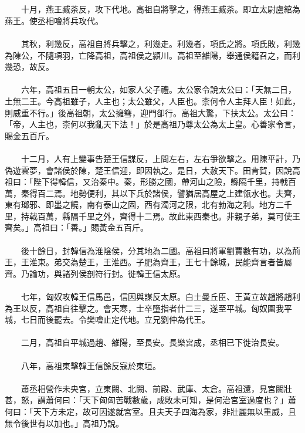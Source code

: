 \\\\
　　十月，燕王臧荼反，攻下代地。高祖自將擊之，得燕王臧荼。即立太尉盧綰為燕王。使丞相噲將兵攻代。
\\\\
　　其秋，利幾反，高祖自將兵擊之，利幾走。利幾者，項氏之將。項氏敗，利幾為陳公，不隨項羽，亡降高祖，高祖侯之潁川。高祖至雒陽，舉通侯籍召之，而利幾恐，故反。
\\\\
　　六年，高祖五日一朝太公，如家人父子禮。太公家令說太公曰：「天無二日，土無二王。今高祖雖子，人主也；太公雖父，人臣也。柰何令人主拜人臣！如此，則威重不行。」後高祖朝，太公擁篲，迎門卻行。高祖大驚，下扶太公。太公曰：「帝，人主也，柰何以我亂天下法！」於是高祖乃尊太公為太上皇。心善家令言，賜金五百斤。
\\\\
　　十二月，人有上變事告楚王信謀反，上問左右，左右爭欲擊之。用陳平計，乃偽遊雲夢，會諸侯於陳，楚王信迎，即因執之。是日，大赦天下。田肯賀，因說高祖曰：「陛下得韓信，又治秦中。秦，形勝之國，帶河山之險，縣隔千里，持戟百萬，秦得百二焉。地勢便利，其以下兵於諸侯，譬猶居高屋之上建瓴水也。夫齊，東有瑯邪、即墨之饒，南有泰山之固，西有濁河之限，北有勃海之利。地方二千里，持戟百萬，縣隔千里之外，齊得十二焉。故此東西秦也。非親子弟，莫可使王齊矣。」高祖曰：「善。」賜黃金五百斤。
\\\\
　　後十餘日，封韓信為淮陰侯，分其地為二國。高祖曰將軍劉賈數有功，以為荊王，王淮東。弟交為楚王，王淮西。子肥為齊王，王七十餘城，民能齊言者皆屬齊。乃論功，與諸列侯剖符行封。徙韓王信太原。
\\\\
　　七年，匈奴攻韓王信馬邑，信因與謀反太原。白土曼丘臣、王黃立故趙將趙利為王以反，高祖自往擊之。會天寒，士卒墮指者什二三，遂至平城。匈奴圍我平城，七日而後罷去。令樊噲止定代地。立兄劉仲為代王。
\\\\
　　二月，高祖自平城過趙、雒陽，至長安。長樂宮成，丞相已下徙治長安。
\\\\
　　八年，高祖東擊韓王信餘反寇於東垣。
\\\\
　　蕭丞相營作未央宮，立東闕、北闕、前殿、武庫、太倉。高祖還，見宮闕壯甚，怒，謂蕭何曰：「天下匈匈苦戰數歲，成敗未可知，是何治宮室過度也？」蕭何曰：「天下方未定，故可因遂就宮室。且夫天子四海為家，非壯麗無以重威，且無令後世有以加也。」高祖乃說。
\\\\
